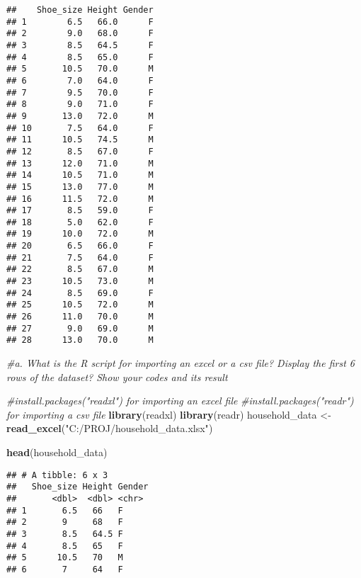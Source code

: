 \documentclass[
]{article}
\newenvironment{Shaded}{\begin{snugshade}}{\end{snugshade}}
\newcommand{\CommentTok}[1]{\textcolor[rgb]{0.56,0.35,0.01}{\textit{#1}}}
\newcommand{\FunctionTok}[1]{\textcolor[rgb]{0.13,0.29,0.53}{\textbf{#1}}}
\newcommand{\NormalTok}[1]{#1}
\newcommand{\OtherTok}[1]{\textcolor[rgb]{0.56,0.35,0.01}{#1}}
\newcommand{\StringTok}[1]{\textcolor[rgb]{0.31,0.60,0.02}{#1}}
\begin{document}
\begin{verbatim}
##    Shoe_size Height Gender
## 1        6.5   66.0      F
## 2        9.0   68.0      F
## 3        8.5   64.5      F
## 4        8.5   65.0      F
## 5       10.5   70.0      M
## 6        7.0   64.0      F
## 7        9.5   70.0      F
## 8        9.0   71.0      F
## 9       13.0   72.0      M
## 10       7.5   64.0      F
## 11      10.5   74.5      M
## 12       8.5   67.0      F
## 13      12.0   71.0      M
## 14      10.5   71.0      M
## 15      13.0   77.0      M
## 16      11.5   72.0      M
## 17       8.5   59.0      F
## 18       5.0   62.0      F
## 19      10.0   72.0      M
## 20       6.5   66.0      F
## 21       7.5   64.0      F
## 22       8.5   67.0      M
## 23      10.5   73.0      M
## 24       8.5   69.0      F
## 25      10.5   72.0      M
## 26      11.0   70.0      M
## 27       9.0   69.0      M
## 28      13.0   70.0      M
\end{verbatim}

\begin{Shaded}
\begin{Highlighting}[]
\CommentTok{\#a. What is the R script for importing an excel or a csv file? Display the first 6 rows of the dataset? Show your codes and its result}

\CommentTok{\#install.packages("readxl") for importing an excel file }
\CommentTok{\#install.packages("readr") for importing a csv file}
\FunctionTok{library}\NormalTok{(readxl)}
\FunctionTok{library}\NormalTok{(readr)}
\NormalTok{household\_data }\OtherTok{\textless{}{-}} \FunctionTok{read\_excel}\NormalTok{(}\StringTok{"C:/PROJ/household\_data.xlsx"}\NormalTok{)}

\FunctionTok{head}\NormalTok{(household\_data)}
\end{Highlighting}
\end{Shaded}

\begin{verbatim}
## # A tibble: 6 x 3
##   Shoe_size Height Gender
##       <dbl>  <dbl> <chr> 
## 1       6.5   66   F     
## 2       9     68   F     
## 3       8.5   64.5 F     
## 4       8.5   65   F     
## 5      10.5   70   M     
## 6       7     64   F
\end{verbatim}
\end{document}
